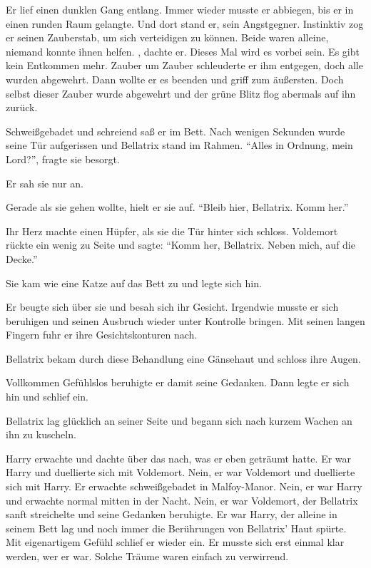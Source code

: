 \begin{traum}
Er lief einen dunklen Gang entlang. Immer wieder musste er abbiegen, bis er in einen runden Raum gelangte. Und dort stand er, sein Angstgegner. Instinktiv zog er seinen Zauberstab, um sich verteidigen zu können. Beide waren alleine, niemand konnte ihnen helfen. , dachte er. Dieses Mal wird es vorbei sein. Es gibt kein Entkommen mehr. Zauber um Zauber schleuderte er ihm entgegen, doch alle wurden abgewehrt. Dann wollte er es beenden und griff zum äußersten. Doch selbst dieser Zauber wurde abgewehrt und der grüne Blitz flog abermals auf ihn zurück.

Schweißgebadet und schreiend saß er im Bett. Nach wenigen Sekunden wurde seine Tür aufgerissen und Bellatrix stand im Rahmen. \enquote{Alles in Ordnung, mein Lord?}, fragte sie besorgt.

Er sah sie nur an.

Gerade als sie gehen wollte, hielt er sie auf. \enquote{Bleib hier, Bellatrix. Komm her.}

Ihr Herz machte einen Hüpfer, als sie die Tür hinter sich schloss. Voldemort rückte ein wenig zu Seite und sagte: \enquote{Komm her, Bellatrix. Neben mich, auf die Decke.}

Sie kam wie eine Katze auf das Bett zu und legte sich hin.

Er beugte sich über sie und besah sich ihr Gesicht. Irgendwie musste er sich beruhigen und seinen Ausbruch wieder unter Kontrolle bringen. Mit seinen langen Fingern fuhr er ihre Gesichtskonturen nach.

Bellatrix bekam durch diese Behandlung eine Gänsehaut und schloss ihre Augen.

Vollkommen Gefühlslos beruhigte er damit seine Gedanken. Dann legte er sich hin und schlief ein.

Bellatrix lag glücklich an seiner Seite und begann sich nach kurzem Wachen an ihn zu kuscheln.
\end{traum}

Harry erwachte und dachte über das nach, was er eben geträumt hatte. Er war Harry und duellierte sich mit Voldemort. Nein, er war Voldemort und duellierte sich mit Harry. Er erwachte schweißgebadet in Malfoy-Manor. Nein, er war Harry und erwachte normal mitten in der Nacht. Nein, er war Voldemort, der Bellatrix sanft streichelte und seine Gedanken beruhigte. Er war Harry, der alleine in seinem Bett lag und noch immer die Berührungen von Bellatrix’ Haut spürte. Mit eigenartigem Gefühl schlief er wieder ein. Er musste sich erst einmal klar werden, wer er war. Solche Träume waren einfach zu verwirrend.

